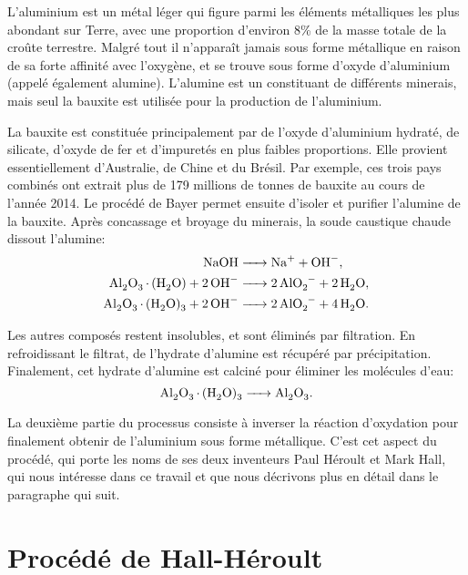 L'aluminium est un métal léger qui figure parmi les éléments
métalliques les plus abondant sur Terre, avec une proportion d'environ
\num{8}\% de la masse totale de la croûte terrestre. Malgré tout il
n'apparaît jamais sous forme métallique en raison de sa forte affinité
avec l'oxygène, et se trouve sous forme d'oxyde d'aluminium 
(appelé également alumine). L'alumine est un constituant de différents
minerais, mais seul la bauxite est utilisée pour la production de
l'aluminium.

La bauxite est constituée principalement par de l'oxyde d'aluminium
hydraté, de silicate, d'oxyde de fer et d'impuretés en plus faibles
proportions. Elle provient essentiellement d'Australie, de Chine et du
Brésil. Par exemple, ces trois pays combinés ont extrait plus de
\num{179} millions de tonnes de bauxite au cours de l'année
\num{2014}. Le procédé de Bayer permet ensuite d'isoler et purifier
l'alumine de la bauxite. Après concassage et broyage du minerais, la
soude caustique chaude dissout l'alumine:
\begin{align*}
  \cee{NaOH &-> Na+ + OH-},\\
  \cee{Al2O3.(H2O) + 2OH- &-> 2AlO2- + 2H2O},\\
  \cee{Al2O3.(H2O)3 + 2OH- &-> 2AlO2- + 4H2O}.
\end{align*}

Les autres composés restent insolubles, et sont éliminés par
filtration. En refroidissant le filtrat, de l'hydrate d'alumine est
récupéré par précipitation. Finalement, cet hydrate d'alumine est
calciné pour éliminer les molécules d'eau:
\begin{equation*}
  \cee{Al2O3.(H2O)3 -> Al2O3}.
\end{equation*}

La deuxième partie du processus consiste à inverser la réaction
d'oxydation pour finalement obtenir de l'aluminium sous forme
métallique. C'est cet aspect du procédé, qui porte les noms de ses
deux inventeurs Paul Héroult et Mark Hall, qui nous intéresse dans
ce travail et que nous décrivons plus en détail dans le paragraphe
qui suit.

\section{Procédé de Hall-Héroult}
\label{sec:introduction-hall-heroult}



